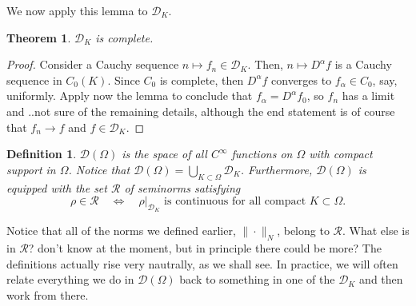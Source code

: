 \documentclass[letterpaper,twoside,11pt]{article}
\theoremstyle{mystyle}
\newtheorem{theorem}{Theorem}[section]
\newtheorem{definition}{Definition}[section]
\newcommand{\cg}{\color{gray}}
\newcommand{\cbk}{\color{black}}
\newcommand{\cred}{\color{red}}
\begin{document}
We now apply this lemma to $\mathcal D_K$. 
\begin{tcolorbox}[colback=red!5!white,colframe=red!75!black]
\begin{theorem}
  $\mathcal D_K$ is complete. 
\end{theorem}
\end{tcolorbox}
\begin{proof}
  Consider a Cauchy sequence $n\mapsto f_n \in \mathcal D_K$. Then, $n \mapsto D^\alpha f$ is a Cauchy sequence in $C_0(K)$. Since $C_0$ is complete, then $D^\alpha f$ converges to $f_\alpha \in C_0$, say, uniformly. Apply now the lemma to conclude that $f_\alpha = D^\alpha f_0$, so $f_n$ has a limit and ..\cred not sure of the remaining details, although the end statement is of course that $f_n \to f$ and $f \in \mathcal D_K$. \cbk 
\end{proof}
\begin{definition}
  $\mathcal D(\Omega)$ is the space of all $C^\infty$ functions on $\Omega$ with compact support in $\Omega$. Notice that $\mathcal D(\Omega) = \bigcup_{K\subset \Omega } \mathcal D_K$. Furthermore, $\mathcal D(\Omega)$ is equipped with the set $\mathcal R$ of seminorms satisfying 
  \[\rho \in \mathcal R \quad \Longleftrightarrow \quad  \rho|_{\mathcal D_K} \text{ is continuous for all compact } K \subset \Omega.\]
\end{definition}
Notice that all of the norms we defined earlier, $\|\cdot \|_N$, belong to $\mathcal R$. \cg What else is in $\mathcal R$? don't know at the moment, but in principle there could be more? \cbk 
The definitions actually rise very nautrally, as we shall see. In practice, we will often relate everything we do in $\mathcal D(\Omega)$ back to something in one of the $\mathcal D_K$ and then work from there. 
\end{document}

